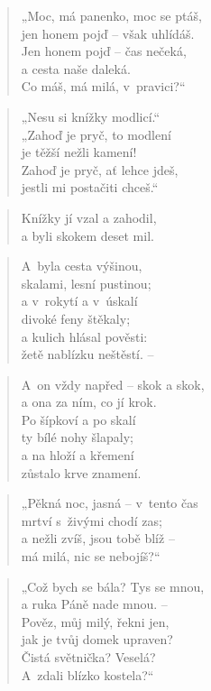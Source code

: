 \begin{verse}
„Moc, má panenko, moc se ptáš, \\
jen honem pojď -- však uhlídáš. \\
Jen honem pojď -- čas nečeká, \\
a cesta naše daleká. \\
Co máš, má milá, v~pravici?“
\end{verse}

\begin{verse}
„Nesu si knížky modlicí.“ \\
„Zahoď je pryč, to modlení \\
je těžší nežli kamení! \\
Zahoď je pryč, ať lehce jdeš, \\
jestli mi postačiti chceš.“
\end{verse}

\begin{verse}
Knížky jí vzal a zahodil, \\
a byli skokem deset mil.
\end{verse}

\begin{verse}
A~byla cesta výšinou, \\
skalami, lesní pustinou; \\
a v~rokytí a v~úskalí \\
divoké feny štěkaly; \\
a kulich hlásal pověsti: \\
žetě nablízku neštěstí. --
\end{verse}

\begin{verse}
A~on vždy napřed -- skok a skok, \\
a ona za ním, co jí krok. \\
Po šípkoví a po skalí \\
ty bílé nohy šlapaly; \\
a na hloží a křemení \\
zůstalo krve znamení.
\end{verse}

\begin{verse}
„Pěkná noc, jasná -- v~tento čas \\
mrtví s~živými chodí zas; \\
a nežli zvíš, jsou tobě blíž -- \\
má milá, nic se nebojíš?“
\end{verse}

\begin{verse}
„Což bych se bála? Tys se mnou, \\
a ruka Páně nade mnou. -- \\
Pověz, můj milý, řekni jen, \\
jak je tvůj domek upraven? \\
Čistá světnička? Veselá? \\
A~zdali blízko kostela?“
\end{verse}

